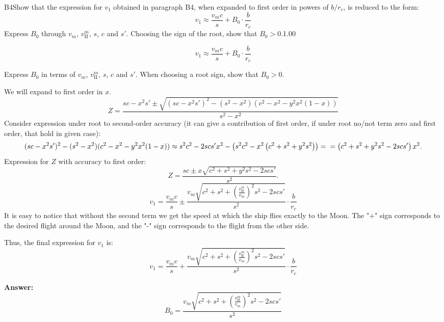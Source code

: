 \documentclass[11pt,a4paper]{article}
\begin{document}
\begin{solcard}{B4}{Show that the expression for $v_1$ obtained in paragraph B4, when expanded to first order in powers of $b/r_c$, is reduced to the form: $$v_1 \approx \dfrac{v_m c}{s} + B_0\cdot \dfrac{b}{r_c}$$ Express $B_0$ through $v_m$, $v_\text{II}^m$, $s$, $c$ and $s'$. Choosing the sign of the root, show that $B_0 > 0$.}{1.00}

$$v_1 \approx \dfrac{v_m c}{s} + B_0\cdot \dfrac{b}{r_c}$$


Express $B_0$ in terms of $v_m$, $v_\text{II}^m$, $s$, $c$ and $s'$. When choosing a root sign, show that $B_0 > 0$.


We will expand to first order in $x$. $$Z = \frac{sc-x^2s'\pm\sqrt{(sc-x^2s')^2-(s^2-x^2)(c^2-x^2-y^2x^2(1-x))}}{s^2-x^2}$$Consider expression under root to second-order accuracy (it can give a contribution of first order, if under root no/not term zero and first order, that hold in given case): $$(sc-x^2s')^2-(s^2-x^2)(c^2-x^2-y^2x^2(1-x)) \approx s^2c^2 - 2scs'x^2 - \left(s^2c^2-x^2\left(c^2+s^2+y^2s^2\right)\right)=\\=\left(c^2+s^2+y^2s^2-2scs'\right)x^2.$$Expression for $Z$ with accuracy to first order: $$Z = \frac{sc\pm x\sqrt{c^2+s^2+y^2s^2-2scs'}}{s^2}.$$$$v_1 = \frac{v_mc}{s}\pm\frac{v_m\sqrt{c^2+s^2+\left(\frac{v_\text{II}^m}{v_m}\right)^2s^2-2scs'}}{s^2}\cdot\frac{b}{r_c}$$It is easy to notice that without the second term we get the speed at which the ship flies exactly to the Moon. The "+" sign corresponds to the desired flight around the Moon, and the "-" sign corresponds to the flight from the other side.


Thus, the final expression for $v_1$ is: $$v_1 = \frac{v_mc}{s}+\frac{v_m\sqrt{c^2+s^2+\left(\frac{v_\text{II}^m}{v_m}\right)^2s^2-2scs'}}{s^2}\cdot\frac{b}{r_c}$$

\par\smallskip\noindent\textbf{Answer:} $$B_0 = \frac{v_m\sqrt{c^2+s^2+\left(\frac{v_\text{II}^m}{v_m}\right)^2s^2-2scs'}}{s^2}$$
\end{solcard}
\end{document}
